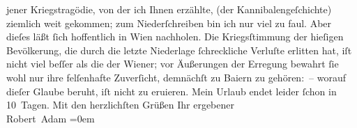 \begin{ledgroupsized}[t]{13cm}
               jener Kriegstragödie, von der ich Ihnen erzählte, (der Kannibalengeſchichte)
               ziemlich weit gekommen; zum Niederſchreiben bin ich nur viel zu faul. Aber dieſes
               läßt ſich hoffentlich in Wien nachholen.\pend
           \pstart
           Die Kriegsſtimmung der hieſigen Bevölkerung, die durch die letzte Niederlage
               ſchreckliche Verluſte erlitten hat, iſt nicht viel beſſer als die der Wiener; vor Äußerungen der Erregung bewahrt ſie wohl nur ihre
               felſenhafte Zuverſicht, demnächſt zu Baiern zu
               gehören: – worauf dieſer Glaube beruht, iſt nicht zu eruieren.\pend
           \pstart
           Mein Urlaub endet leider ſchon in 10 Tagen.\pend
           \pstart
           Mit den herzlichſten Grüßen\pend
           \pstart
           Ihr ergebener{\\[\baselineskip]}\spacefill\mbox{Robert Adam}\pend
           \leftskip=0em{}
         
         \endnumbering{}\end{ledgroupsized}  \newcommand{\dateiname}{L02289}\newcommand{\titel}{Robert Adam an Arthur Schnitzler, 17. 7. 1918}\newcommand{\editorInnen}{Martin Anton Müller und Gerd-Hermann Susen}
      